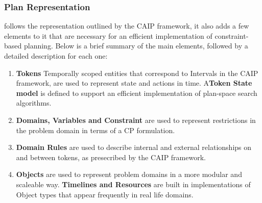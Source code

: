 \subsubsection{\eu Plan Representation}
\label{sec:europa:pr}

\eu follows the representation outlined by the CAIP framework, it also
adds a few elements to it that are necessary for an efficient
implementation of constraint-based planning. Below is a brief summary
of the main elements, followed by a detailed description for each one:


\begin{enumerate}

\item \textbf{Tokens} Temporally scoped entities that correspond to
  Intervals in the CAIP framework, are used to represent state and
  actions in time. A\textbf{Token State model} is defined to support
  an efficient implementation of plan-space search algorithms.

\item \textbf{Domains, Variables and Constraint} are used to represent
  restrictions in the problem domain in terms of a CP formulation.

\item \textbf{Domain Rules} are used to describe internal and external
  relationships on and between tokens, as presecribed by the CAIP
  framework.
  
\item \textbf{Objects} are used to represent problem domains in a more
  modular and scaleable way. \textbf{Timelines and Resources} are
  built in implementations of Object types that appear frequently in
  real life domains.

\end{enumerate}

